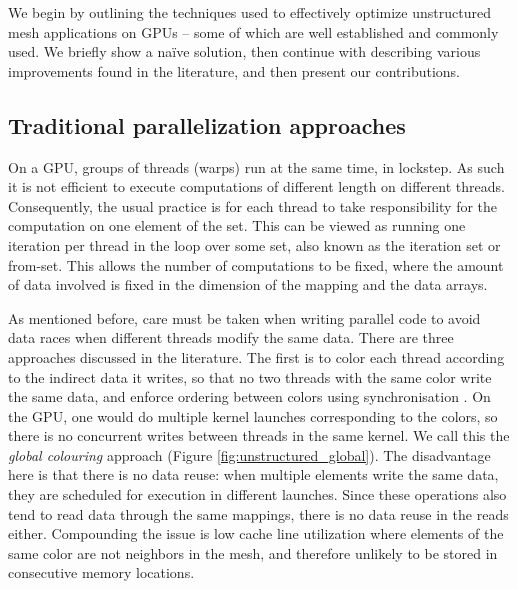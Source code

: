 \noindent We begin by outlining the techniques used to effectively optimize 
unstructured mesh applications on GPUs -- some of which are well established 
and commonly used. We briefly show a na\"{i}ve solution, then continue 
with describing various improvements found in the literature, and then present 
our contributions.

\subsection{Traditional parallelization approaches}

\noindent On a GPU, groups of threads (warps) run at the same time, in 
lockstep. As such it is not efficient to execute computations of different 
length on different threads. Consequently, the usual practice is for each thread 
to take responsibility for the computation on one element of the set. This can 
be viewed as running one iteration per thread in the loop over some set, also 
known as the iteration set or from-set. This allows the number of computations 
to be fixed, where the amount of data involved is fixed in the dimension of the 
mapping and the data arrays.

As mentioned before, care must be taken when writing parallel code to avoid 
data races when different threads modify the same data. There are three 
approaches discussed in the literature. The first is to color each thread 
according to the indirect data it writes, so that no two threads with the same 
color write the same data, and enforce ordering between colors using 
synchronisation \cite{Zegard2013}. On the GPU, one would do multiple kernel 
launches corresponding to the colors, so there is no concurrent writes between 
threads in the same kernel. We call this the \emph{global colouring} approach 
(Figure \ref{fig:unstructured_global}). The disadvantage here is that there is 
no data reuse: when multiple elements write the same data, they are scheduled 
for execution in different launches. Since these operations also tend to read 
data through the same mappings, there is no data reuse in the reads either. 
Compounding the issue is low cache line utilization where elements of the same 
color are not neighbors in the mesh, and therefore unlikely to be stored in 
consecutive memory locations.

